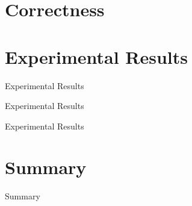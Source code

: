 \documentclass{beamer}
\begin{document}
\section{Correctness}

\section{Experimental Results}

\begin{frame}{Experimental Results}
  \centering
  
\end{frame}

\begin{frame}{Experimental Results}
  \centering
  
\end{frame}

\begin{frame}{Experimental Results}
  \centering
  
\end{frame}

\section{Summary}

\begin{frame}{Summary}
\end{frame}
\end{document}
